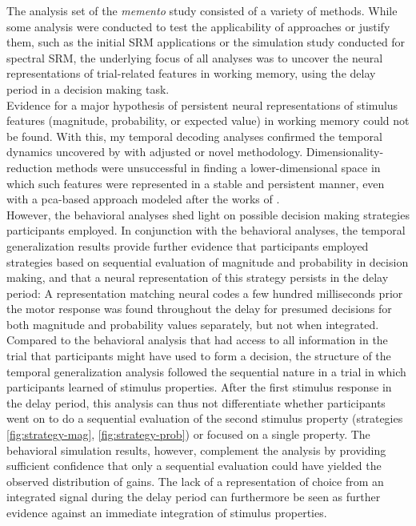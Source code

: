 The analysis set of the \textit{memento} study consisted of a variety of methods.
While some analysis were conducted to test the applicability of approaches or justify them, such as the initial \gls{SRM} applications or the simulation study conducted for spectral \gls{SRM}, the underlying focus of all analyses was to uncover the neural representations of trial-related features in working memory, using the delay period in a decision making task.\\
Evidence for a major hypothesis of persistent neural representations of stimulus features (magnitude, probability, or expected value) in working memory could not be found.
With this, my temporal decoding analyses confirmed the temporal dynamics uncovered by \citet{kaiserposter} with adjusted or novel methodology.
Dimensionality-reduction methods were unsuccessful in finding a lower-dimensional space in which such features were represented in a stable and persistent manner, even with a \gls{pca}-based approach modeled after the works of \citet{murray2017stable}.\\
However, the behavioral analyses shed light on possible decision making strategies participants employed.
In conjunction with the behavioral analyses, the temporal generalization results provide further evidence that participants employed strategies based on sequential evaluation of magnitude and probability in decision making, and that a neural representation of this strategy persists in the delay period:
A representation matching neural codes a few hundred milliseconds prior the motor response was found throughout the delay for presumed decisions for both magnitude and probability values separately, but not when integrated.
Compared to the behavioral analysis that had access to all information in the trial that participants might have used to form a decision, the structure of the temporal generalization analysis followed the sequential nature in a trial in which participants learned of stimulus properties.
After the first stimulus response in the delay period, this analysis can thus not differentiate whether participants went on to do a sequential evaluation of the second stimulus property (strategies \ref{fig:strategy-mag}, \ref{fig:strategy-prob}) or focused on a single property.
The behavioral simulation results, however, complement the analysis by providing sufficient confidence that only a sequential evaluation could have yielded the observed distribution of gains.
The lack of a representation of choice from an integrated signal during the delay period can furthermore be seen as further evidence against an immediate integration of stimulus properties.
